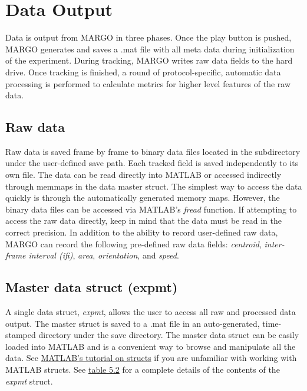 \documentclass[11pt]{article}
\begin{document}
\newpage
\section{Data Output}

Data is output from MARGO in three phases. Once the play button is pushed, MARGO generates and saves a .mat file with all meta data during initialization of the experiment. During tracking, MARGO writes raw data fields to the hard drive. Once tracking is finished, a round of protocol-specific, automatic data processing is performed to calculate metrics for higher level features of the raw data.

\subsection{Raw data}

Raw data is saved frame by frame to binary data files located in the subdirectory under the user-defined save path. Each tracked field is saved independently to its own file. The data can be read directly into MATLAB or accessed indirectly through memmaps in the data master struct. The simplest way to access the data quickly is through the automatically generated memory maps. However, the binary data files can be accessed via MATLAB's \textit{fread} function. If attempting to access the raw data directly, keep in mind that the data must be read in the correct precision. In addition to the ability to record user-defined raw data, MARGO can record the following pre-defined raw data fields: \textit{centroid},\textit{ inter-frame interval (ifi)}, \textit{area}, \textit{orientation}, and \textit{speed}.

\subsection{Master data struct (expmt)}

A single data struct, \textit{expmt}, allows the user to access all raw and processed data output. The master struct is saved to a .mat file in an auto-generated, time-stamped directory under the save directory. The master data struct can be easily loaded into MATLAB and is a convenient way to browse and manipulate all the data. See \href{https://www.mathworks.com/help/matlab/structures.html}{MATLAB's tutorial on structs} if you are unfamiliar with working with MATLAB structs. See \hyperlink{expmttable}{table 5.2} for a complete details of the contents of the \textit{expmt} struct.
\end{document}
